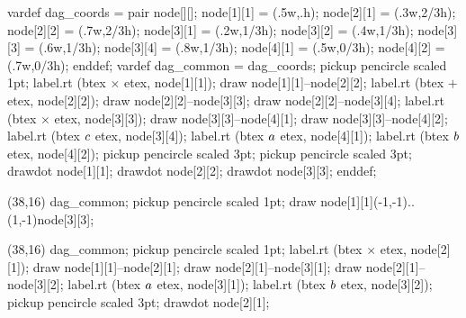 \documentclass[a4paper]{article}
\newcommand{\magnification}{1}
\newlength{\logoheight}
\newlength{\logowidth}
\newcounter{logo}
\newcommand{\shiplogo}[1]{%
  \setbox0\hbox{#1}%
  \logowidth=\wd0%
  \logoheight=\ht0%
  \multiply\logoheight by \magnification%
  \multiply\logowidth by \magnification%
  \edef\dvipscmd{dvips -E -p=\the\value{logo} -n1 %
     -O -1in,-1in -T \the\logowidth,\the\logoheight\space %
     -o \jobname-\the\value{logo}.eps \jobname}%
  \immediate\write\dvipscmds{\dvipscmd}%
  \edef\dvipscmd{epstopdf \jobname-\the\value{logo}.eps}%
  \immediate\write\dvipscmds{\dvipscmd}%
  \shipout\box0%
  \stepcounter{logo}}
\newenvironment{logos}[1]%
  {\ignorespaces\immediate\openout\dvipscmds=#1.sh}%
  {\immediate\closeout\dvipscmds}
\begin{document}
\setlength{\parindent}{0pt}
\begin{empfile}
\begin{empcmds}
  vardef dag_coords =
    pair node[][]; node[1][1] = (.5w,.h);
    node[2][1] = (.3w,2/3h); node[2][2] = (.7w,2/3h);
    node[3][1] = (.2w,1/3h); node[3][2] = (.4w,1/3h);
    node[3][3] = (.6w,1/3h); node[3][4] = (.8w,1/3h);
    node[4][1] = (.5w,0/3h); node[4][2] = (.7w,0/3h);
  enddef;
  vardef dag_common =
    dag_coords;
    pickup pencircle scaled 1pt;
    label.rt (btex $\times$ etex, node[1][1]);
    draw node[1][1]--node[2][2];
    label.rt (btex $+$ etex, node[2][2]);
    draw node[2][2]--node[3][3];
    draw node[2][2]--node[3][4];
    label.rt (btex $\times$ etex, node[3][3]);
    draw node[3][3]--node[4][1];
    draw node[3][3]--node[4][2];
    label.rt (btex $\vphantom{b}c$ etex, node[3][4]);
    label.rt (btex $\vphantom{b}a$ etex, node[4][1]);
    label.rt (btex $\vphantom{b}b$ etex, node[4][2]);
    pickup pencircle scaled 3pt;
    pickup pencircle scaled 3pt;
    drawdot node[1][1];
    drawdot node[2][2];
    drawdot node[3][3];
  enddef;
\end{empcmds}
\begin{empdef}[dag](38,16)
  dag_common;
  pickup pencircle scaled 1pt;
  draw node[1][1]{(-1,-1)}..{(1,-1)}node[3][3];
\end{empdef}
\begin{empdef}[tree](38,16)
  dag_common;
  pickup pencircle scaled 1pt;
  label.rt (btex $\times$ etex, node[2][1]);
  draw node[1][1]--node[2][1];
  draw node[2][1]--node[3][1];
  draw node[2][1]--node[3][2];
  label.rt (btex $\vphantom{b}a$ etex, node[3][1]);
  label.rt (btex $\vphantom{b}b$ etex, node[3][2]);
  pickup pencircle scaled 3pt;
  drawdot node[2][1];
\end{empdef}
\end{empfile}
\end{document}
